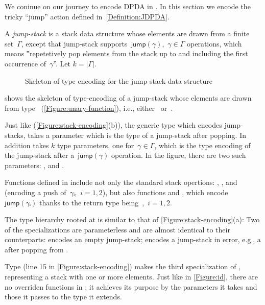 We coninue on our journey to encode DPDA in \Java.
In this section we encode the tricky ``jump'' action defined in~\cref{Definition:JDPDA}.

A \emph{jump-stack} is a stack data structure whose elements are drawn from a finite set~$Γ$,
  except that jump-stack supports~$\textsf{jump}(γ)$,~$γ∈Γ$ operations,
    which means
  ‟repetetively pop elements from the stack up to and including the first occurrence of~$γ$”.
Let $k=|\Gamma|$. 

\begin{wrapfigure}[16]{r}{42ex}
  \caption{Skeleton of type encoding for the jump-stack data structure}%
  \label{Figure:jump}%
  \lstset{style=numbered}
\end{wrapfigure}

 shows the skeleton of type-encoding of a jump-stack whose
elements are drawn from type~
(\cref{Figure:unary-function}), i.e., either~ or~.

Just like  (\cref{Figure:stack-encoding}(b)),
  the generic type  which encodes jump-stacks, takes
  a  parameter which is the type of a jump-stack after popping.
In addition  takes $k$ type parameters, one for~$γ∈Γ$,
  which is the type encoding of the jump-stack after a~$\textsf{jump}(γ)$
  operation.
In the figure, there are two such parameters: , and
  .

Functions defined in  include not only the standard stack opertions: ,
,  and~ (encoding a push of~$γᵢ$,~$i=1,2$),
  but also functions  and ,
  which encode~$\textsf{jump}(γᵢ)$
  thanks to the return type being~,~$i=1,2$.

The type hierarchy rooted at  is similar to that of
\cref{Figure:stack-encoding}(a):
  Two of the specializations are parameterless and are
  almost identical to their 
  counterparts:
 encodes an empty jump-stack;  encodes a jump-stack in error,
e.g., a after popping from .



Type  (line 15 in \cref{Figure:stack-encoding}) makes  the third specialization of , representing 
  a stack with one or more elements.
Just like in \cref{Figure:id}, there are no overriden functions in ; it achieves
  its purpose by the parameters it takes and those it passes
  to the type it extends.

